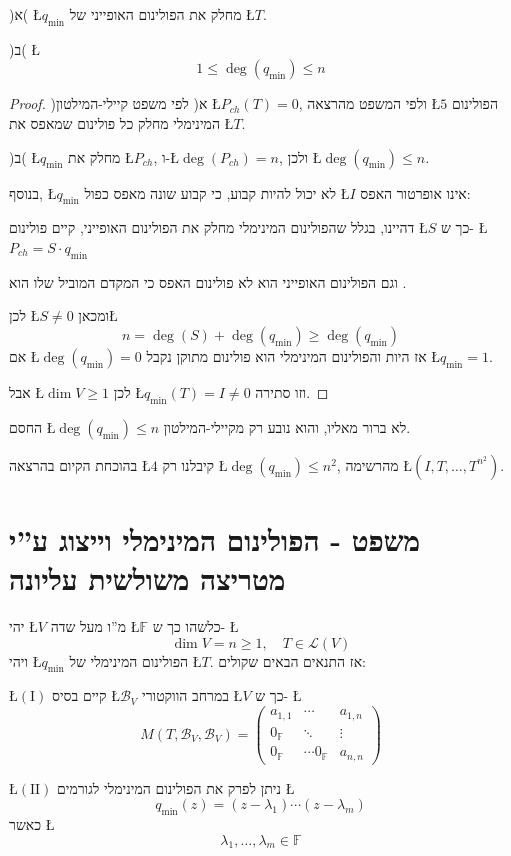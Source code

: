 \documentclass[english,hebrew]{article}
\begin{document}
)א( \L{$q_{\min}$} מחלק את הפולינום האופייני של \L{$T$}.

)ב( \L{%
\[
1\leq\deg(q_{\min})\leq n
\]
}%

\begin{proof}
)א( לפי משפט קיילי-המילטון \L{$P_{ch}(T)=0$}, ולפי המשפט מהרצאה \L{$5$}
הפולינום המינימלי מחלק כל פולינום שמאפס את \L{$T$}.

)ב( \L{$q_{\min}$} מחלק את \L{$P_{ch}$}, ו-\L{$\deg(P_{ch})=n$},
ולכן \L{$\deg(q_{\min})\leq n$}.

בנוסף, \L{$q_{\min}$} לא יכול להיות קבוע, כי קבוע שונה מאפס כפול
\L{$I$} אינו אופרטור האפס:

דהיינו, בגלל שהפולינום המינימלי מחלק את הפולינום האופייני, קיים פולינום
\L{$S$} כך ש{\beginL -\endL} \L{$P_{ch}=S\cdot q_{\min}$}

וגם הפולינום האופייני הוא לא פולינום האפס כי המקדם המוביל שלו הוא
{\endL}. 

לכן \L{$S\neq0$} ומכאן\L{%
\[
n=\deg(S)+\deg(q_{\min})\geq\deg(q_{\min})
\]
}%
אם \L{$\deg(q_{\min})=0$} אז היות והפולינום המינימלי הוא פולינום
מתוקן נקבל \L{$q_{\min}=1$}.

אבל \L{$\dim V\geq1$} לכן \L{$q_{\min}(T)=I\neq0$} וזו סתירה.
\end{proof}
החסם \L{$\deg(q_{\min})\leq n$} לא ברור מאליו, והוא נובע רק מקיילי-המילטון. 

בהוכחת הקיום בהרצאה \L{$4$} קיבלנו רק \L{$\deg(q_{\min})\leq n^{2}$},
מהרשימה \L{$(I,T,\dots,T^{n^{2}})$}.

\section{משפט - הפולינום המינימלי וייצוג ע\textquotedblright י מטריצה משולשית
עליונה}

יהי \L{$V$} מ\textquotedblright ו מעל שדה \L{$\mathbb{F}$} כלשהו
כך ש- \L{%
\[
\dim V=n\geq1,\quad T\in\mathcal{L}(V)
\]
}%
ויהי \L{$q_{\min}$} הפולינום המינימלי של \L{$T$}. אז התנאים הבאים
שקולים:

\L{$(\text{I})$} קיים בסיס \L{$\mathcal{B}_{V}$} במרחב הווקטורי
\L{$V$} כך ש- \L{%
\[
M(T,\mathcal{B}_{V},\mathcal{B}_{V})=\begin{pmatrix}a_{1,1} & \cdots & a_{1,n}\\
0_{\mathbb{F}} & \ddots & \vdots\\
0_{\mathbb{F}} & \cdots0_{\mathbb{F}} & a_{n,n}
\end{pmatrix}
\]
}%

\L{$(\text{II})$} ניתן לפרק את הפולינום המינימלי לגורמים \L{%
\[
q_{\min}(z)=(z-\lambda_{1})\cdots(z-\lambda_{m})
\]
}%
כאשר \L{%
\[
\lambda_{1},\dots,\lambda_{m}\in\mathbb{F}
\]
}%
\end{document}
